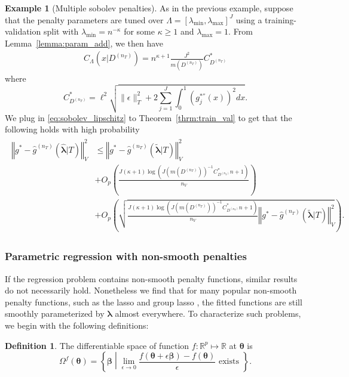 \documentclass[12pt]{article} %
\theoremstyle{definition}
\newtheorem{definition}{Definition}
\newtheorem{example}{Example}
\begin{document}
\begin{example}[Multiple sobolev penalties]
	As in the previous example, suppose that the penalty parameters are tuned over $\Lambda = \left [ \lambda_{\min}, \lambda_{\max} \right ]^J$ using a training-validation split with $\lambda_{\min} = n^{-\kappa}$ for some $\kappa \ge 1$ and $\lambda_{\max} = 1$.
	From Lemma~\ref{lemma:param_add}, we then have
	\begin{align}
	C_{\Lambda}(x|D^{(n_T)}) = n^{\kappa + 1} \frac{J^2}{m(D^{(n_T)})} C^*_{D^{(n_T)}}
	\label{eq:sobolev_lipschitz}
	\end{align}
	where
	$$
	C^*_{D^{(n_T)}} =
	\ell^2
	\sqrt{\|\epsilon\|_T^2  + 2 \sum_{j=1}^J \int_0^1 (g_j^{*''}(x))^2 dx }.
	$$
	We plug in \eqref{eq:sobolev_lipschitz} to Theorem~\ref{thrm:train_val} to get that the following holds with high probability
	\begin{align}
	\begin{split}
	\left\Vert g^* - \hat{g}^{(n_T)}( \hat{\boldsymbol{\lambda}} | T) \right\Vert _{V}^2
	&\le \left\Vert g^* - \hat{g}^{(n_T)}( \tilde{\boldsymbol{\lambda}} | T) \right \Vert^2_{V}\\
	& + O_p\left (
	\frac{
		J (\kappa + 1)
		\log( J (m(D^{(n_T)}))^{-1} C^*_{D^{(n_T)}} n + 1)
	}{n_{V}}
	\right ) \\
	& + O_p\left(
	\sqrt{
		\frac{
			J (\kappa + 1) \log(J (m(D^{(n_T)}))^{-1} C^*_{D^{(n_T)}} n + 1)
		}{n_{V}}
		\left\Vert
		g^* - \hat{g}^{(n_T)}( \tilde{\boldsymbol{\lambda}} | T)
		\right\Vert_{V}^2
	}
	\right ).
	\end{split}
	\end{align}
\end{example}

\subsubsection{Parametric regression with non-smooth penalties}
\label{sec:param_nonsmooth}

If the regression problem contains non-smooth penalty functions, similar results do not necessarily hold. Nonetheless we find that for many popular non-smooth penalty functions, such as the lasso \citep{tibshirani1996regression} and group lasso \citep{yuan2006model}, the fitted functions are still smoothly parameterized by $\boldsymbol \lambda$ almost everywhere.
To characterize such problems, we begin with the following definitions:

\begin{definition}
	The differentiable space of function $f:\mathbb{R}^p \mapsto \mathbb{R}$ at $\boldsymbol{\theta}$ is
	\begin{equation}
	\Omega^{f}(\boldsymbol{\theta}) = \left \{ \boldsymbol{\beta} \middle | \lim_{\epsilon \rightarrow 0} \frac{f(\boldsymbol{\theta} + \epsilon \boldsymbol{\beta}) - f(\boldsymbol{\theta})}{\epsilon} \text{ exists } \right \}.
	\end{equation}
\end{definition}
\end{document}
